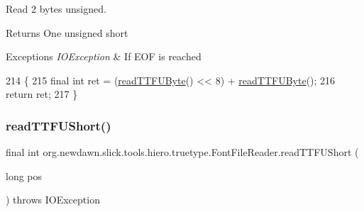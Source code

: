 Read 2 bytes unsigned.

\begin{DoxyReturn}{Returns}
One unsigned short 
\end{DoxyReturn}

\begin{DoxyExceptions}{Exceptions}
{\em I\+O\+Exception} & If E\+OF is reached \\
\hline
\end{DoxyExceptions}

\begin{DoxyCode}
214                                                         \{
215         \textcolor{keyword}{final} \textcolor{keywordtype}{int} ret = (\mbox{\hyperlink{classorg_1_1newdawn_1_1slick_1_1tools_1_1hiero_1_1truetype_1_1_font_file_reader_af208587b367fbf19afbfd0cb584b7563}{readTTFUByte}}() << 8) + \mbox{\hyperlink{classorg_1_1newdawn_1_1slick_1_1tools_1_1hiero_1_1truetype_1_1_font_file_reader_af208587b367fbf19afbfd0cb584b7563}{readTTFUByte}}();
216         \textcolor{keywordflow}{return} ret;
217     \}
\end{DoxyCode}
\mbox{\label{classorg_1_1newdawn_1_1slick_1_1tools_1_1hiero_1_1truetype_1_1_font_file_reader_aed5c964c32c70b938200cf458607788a}} 
\subsubsection{\texorpdfstring{read\+T\+T\+F\+U\+Short()}{readTTFUShort()}\hspace{0.1cm}{\footnotesize\ttfamily [2/2]}}
{\footnotesize\ttfamily final int org.\+newdawn.\+slick.\+tools.\+hiero.\+truetype.\+Font\+File\+Reader.\+read\+T\+T\+F\+U\+Short (\begin{DoxyParamCaption}\item[{long}]{pos }\end{DoxyParamCaption}) throws I\+O\+Exception\hspace{0.3cm}{\ttfamily [inline]}}

